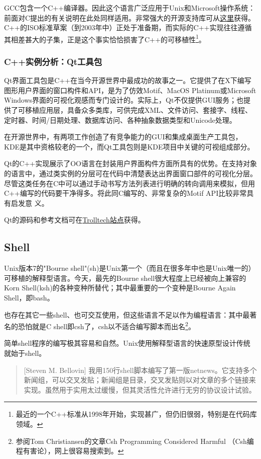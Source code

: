 \documentclass[12pt,oneside]{book}
\begin{document}
GCC包含一个C++编译器。因此这个语言广泛应用于Unix和Microsoft操作系统：前面对C提出的有关说明在此处同样适用。非常强大的开源支持库可从\href{http://www.boost.org/}{这里}获得。C++的ISO标准草案（到2003年中）正处于准备期，而实际的C++实现往往遵循其相差甚大的子集，正是这个事实恰恰损害了C++的可移植性\footnote{最近的一个C++标准从1998年开始，实现甚广，但仍旧很弱，特别是在代码库领域。}。

\subsubsection{C++实例分析：Qt工具包}
Qt界面工具包是C++在当今开源世界中最成功的故事之一。它提供了在X下编写图形用户界面的窗口构件和API，是为了仿效Motif、MacOS Platinum或Microsoft Windows界面的可视化观感而专门设计的。实际上，Qt不仅提供GUI服务；也提供了可移植应用层，具备众多类库，可供完成XML、文件访问、套接字、线程、定时器、时间/日期处理、数据库访问、各种抽象数据类型和Unicode处理。

在开源世界中，有两项工作创造了有竞争能力的GUI和集成桌面生产工具包，KDE是其中资格较老的一个，而Qt工具包则是KDE项目中关键的可视组成部分。

Qt的C++实现展示了OO语言在封装用户界面构件方面所具有的优势。在支持对象的语言中，通过类实例的分层可在代码中清楚表达出界面窗口部件的可视化分层。尽管这类任务在C中可以通过手动书写方法列表进行明确的转向调用来模拟，但用C++编写的代码要干净得多。将此同C编写的、非常复杂的Motif API比较非常具有启发意
义。

Qt的源码和参考文档可在\href{http://www.trolltech.com/}{Trolltech站点}获得。

\subsection{Shell}
Unix版本7的"Bourne shell"(sh)是Unix第一个（而且在很多年中也是Unix唯一的）可移植的解释型语言。今天，最先的Bourne shell很大程度上已经被向上兼容的Korn Shell(ksh)的各种变种所替代；其中最重要的一个变种是Bourne Again Shell，即bash。

也存在其它一些shell、也可交互使用，但这些语言不足以作为编程语言：其中最著名的恐怕就是C shell即csh了，csh以不适合编写脚本而出名\footnote{参阅Tom Christiansen的文章Csh Programming Considered Harmful （Csh编程有害论），网上很容易搜索到。}。

简单shell程序的编写极其容易和自然。Unix使用解释型语言的快速原型设计传统就始于shell。

\begin{quote}[Steven M. Bellovin]
我用150行shell脚本编写了第一版netnews。它支持多个新闻组，可以交叉发贴；新闻组是目录，交叉发贴则以对文章的多个链接来实现。虽然用于实用太过缓慢，但其灵活性允许进行无穷的协议设计试验。
\end{quote}
\end{document}
